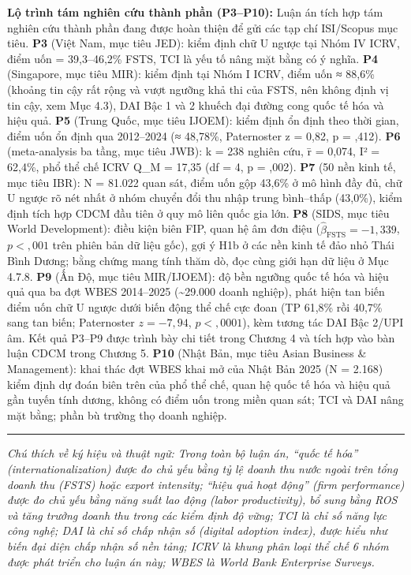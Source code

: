 \documentclass[
  a4paper,
  13pt]{extreport}
\begin{document}
\textbf{Lộ trình tám nghiên cứu thành phần (P3--P10):} Luận án tích hợp
tám nghiên cứu thành phần đang được hoàn thiện để gửi các tạp chí
ISI/Scopus mục tiêu. \textbf{P3} (Việt Nam, mục tiêu JED): kiểm định chữ
U ngược tại Nhóm IV ICRV, điểm uốn = 39,3--46,2\% FSTS, TCI là yếu tố
nâng mặt bằng có ý nghĩa. \textbf{P4} (Singapore, mục tiêu MIR): kiểm
định tại Nhóm I ICRV, điểm uốn ≈ 88,6\% (khoảng tin cậy rất rộng và vượt
ngưỡng khả thi của FSTS, nên không định vị tin cậy, xem Mục 4.3), DAI
Bậc 1 và 2 khuếch đại đường cong quốc tế hóa và hiệu quả. \textbf{P5}
(Trung Quốc, mục tiêu IJOEM): kiểm định ổn định theo thời gian, điểm uốn
ổn định qua 2012--2024 (≈ 48,78\%, Paternoster z = 0,82, p = ,412).
\textbf{P6} (meta-analysis ba tầng, mục tiêu JWB): k = 238 nghiên cứu, r̄
= 0,074, I² = 62,4\%, phổ thể chế ICRV Q\_M = 17,35 (df = 4, p = ,002).
\textbf{P7} (50 nền kinh tế, mục tiêu IBR): N = 81.022 quan sát, điểm
uốn gộp 43,6\% ở mô hình đầy đủ, chữ U ngược rõ nét nhất ở nhóm chuyển
đổi thu nhập trung bình--thấp (43,0\%), kiểm định tích hợp CDCM đầu tiên
ở quy mô liên quốc gia lớn. \textbf{P8} (SIDS, mục tiêu World
Development): điều kiện biên FIP, quan hệ âm đơn điệu
(\(\hat{\beta}_\text{FSTS} = -1{,}339\), \(p < {,}001\) trên phiên bản
dữ liệu gốc), gợi ý H1b ở các nền kinh tế đảo nhỏ Thái Bình Dương; bằng
chứng mang tính thăm dò, đọc cùng giới hạn dữ liệu ở Mục 4.7.8.
\textbf{P9} (Ấn Độ, mục tiêu MIR/IJOEM): độ bền ngưỡng quốc tế hóa và
hiệu quả qua ba đợt WBES 2014--2025 (\textasciitilde29.000 doanh
nghiệp), phát hiện tan biến điểm uốn chữ U ngược dưới biến động thể chế
cực đoan (TP 61,8\% rồi 40,7\% sang tan biến; Paternoster
\(z = -7{,}94\), \(p < {,}0001\)), kèm tương tác DAI Bậc 2/UPI âm. Kết
quả P3--P9 được trình bày chi tiết trong Chương 4 và tích hợp vào bàn
luận CDCM trong Chương 5. \textbf{P10} (Nhật Bản, mục tiêu Asian
Business \& Management): khai thác đợt WBES khai mở của Nhật Bản 2025 (N
= 2.168) kiểm định dự đoán biên trên của phổ thể chế, quan hệ quốc tế
hóa và hiệu quả gần tuyến tính dương, không có điểm uốn trong miền quan
sát; TCI và DAI nâng mặt bằng; phần bù trường thọ doanh nghiệp.

\begin{center}\rule{0.5\linewidth}{0.5pt}\end{center}

\emph{Chú thích về ký hiệu và thuật ngữ: Trong toàn bộ luận án, ``quốc
tế hóa'' (internationalization) được đo chủ yếu bằng tỷ lệ doanh thu
nước ngoài trên tổng doanh thu (FSTS) hoặc export intensity; ``hiệu quả
hoạt động'' (firm performance) được đo chủ yếu bằng năng suất lao động
(labor productivity), bổ sung bằng ROS và tăng trưởng doanh thu trong
các kiểm định độ vững; TCI là chỉ số năng lực công nghệ; DAI là chỉ số
chấp nhận số (digital adoption index), được hiểu như biến đại diện chấp
nhận số nền tảng; ICRV là khung phân loại thể chế 6 nhóm được phát triển
cho luận án này; WBES là World Bank Enterprise Surveys.}
\end{document}
